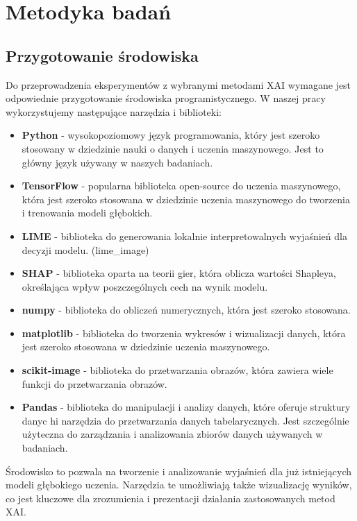 
\chapter*{Metodyka badań}

\section*{Przygotowanie środowiska}

Do przeprowadzenia eksperymentów z wybranymi metodami XAI wymagane jest odpowiednie przygotowanie środowiska programistycznego.
W naszej pracy wykorzystujemy  następujące narzędzia i biblioteki:
\begin{itemize}
	\item \textbf{Python} - wysokopoziomowy język programowania, który jest szeroko stosowany w dziedzinie nauki o danych i uczenia maszynowego.
	      Jest to główny język używany w naszych badaniach.
	\item \textbf{TensorFlow} - popularna biblioteka open-source do uczenia maszynowego, która jest szeroko stosowana w dziedzinie uczenia maszynowego do tworzenia i trenowania modeli głębokich.
	\item \textbf{LIME} - biblioteka do generowania lokalnie interpretowalnych wyjaśnień dla decyzji modelu. (lime\_image)
	\item \textbf{SHAP} - biblioteka oparta na teorii gier, która oblicza wartości Shapleya, określająca wpływ poszczególnych cech na wynik modelu.
	\item \textbf{numpy} - biblioteka do obliczeń numerycznych, która jest szeroko stosowana.
	\item \textbf{matplotlib} - biblioteka do tworzenia wykresów i wizualizacji danych, która jest szeroko stosowana w dziedzinie uczenia maszynowego.
	\item \textbf{scikit-image} - biblioteka do przetwarzania obrazów, która zawiera wiele funkcji do przetwarzania obrazów.
	\item \textbf{Pandas} - biblioteka do manipulacji i analizy danych, które oferuje struktury danyc hi narzędzia do przetwarzania danych tabelarycznych.
	      Jest szczególnie użyteczna do zarządzania i analizowania zbiorów danych używanych w badaniach.
\end{itemize}
Środowisko to pozwala na tworzenie i analizowanie wyjaśnień dla już istniejących modeli głębokiego uczenia.
Narzędzia te umożliwiają także wizualizację wyników, co jest kluczowe dla zrozumienia i prezentacji działania zastosowanych metod XAI.

